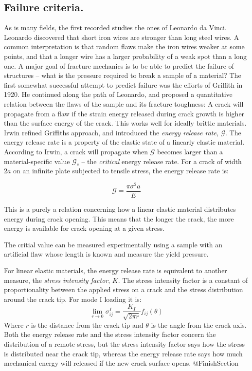 \subsection{Failure criteria.}
As is many fields, the first recorded studies the ones of Leonardo da Vinci. Leonardo discovered that short iron wires are stronger than long steel wires. A common interpretation is that random flaws make the iron wires weaker at some points, and that a longer wire has a larger probability of a weak spot than a long one. A major goal of fracture mechanics is to be able to predict the failure of structures -- what is the pressure required to break a sample of a material? The first somewhat successful attempt to predict failure was the efforts of Griffith in 1920. He continued along the path of Leonardo, and proposed a quantitative relation between the flaws of the sample and its fracture toughness: A crack will propagate from a flaw if the strain energy released during crack growth is higher than the surface energy of the crack. This works well for ideally brittle materials. Irwin refined Griffiths approach, and introduced the \emph{energy release rate}, $\mathcal{G}$. The energy release rate is a property of the elastic state of a linearly elastic material. According to Irwin, a crack will propagate when $\mathcal{G}$ becomes larger than a material-specific value $\mathcal{G}_c$ -- the \emph{critical} energy release rate. For a crack of width $2a$ on an infinite plate subjected to tensile stress, the energy release rate is:

\begin{equation}
	\mathcal{G} = \frac{\pi \sigma^2 a}{E}
\end{equation}

This is a purely a relation concerning how a linear elastic material distributes energy during crack opening. This means that the longer the crack, the more energy is available for crack opening at a given stress.

The critial value can be measured experimentally using a sample with an artificial flaw whose length is known and measure the yield pressure. 

For linear elastic materials, the energy release rate is equivalent to another measure, the \emph{stress intensity factor}, $K$. The stress intensity factor is a constant of proportionality between the applied stress on a crack and the stress distribution around the crack tip. For mode I loading it is:
\begin{equation}
	\lim_{r \to 0} \sigma_{ij}^I = \frac{K_I}{\sqrt{2\pi r}} f_{ij}(\theta)
\end{equation}
Where $r$ is the distance from the crack tip and $\theta$ is the angle from the crack axis. Both the energy release rate and the stress intensity factor concern the distribution of a remote stress, but the stress intensity factor says how the stress is distributed near the crack tip, whereas the energy release rate says how much mechanical energy will released if the new crack surface opens. @FinishSection


